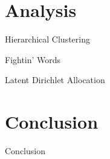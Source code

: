 \documentclass[12pt]{beamer}
\begin{document}
\section{Analysis}
\begin{frame}{Hierarchical Clustering}
\end{frame}

\begin{frame}{Fightin' Words}
\begin{figure}
	\hfill
	\hfill
\end{figure}
\end{frame}

\begin{frame}{Latent Dirichlet Allocation}
\end{frame}

\section{Conclusion}
\begin{frame}{Conclusion}
\end{frame}
\end{document}
